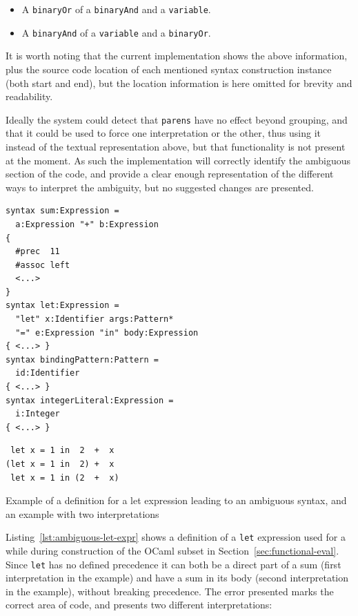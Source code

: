 \documentclass{kththesis}
\begin{document}
\begin{itemize}
  \item A \texttt{binaryOr} of a \texttt{binaryAnd} and a \texttt{variable}.
  \item A \texttt{binaryAnd} of a \texttt{variable} and a \texttt{binaryOr}.
\end{itemize}

It is worth noting that the current implementation shows the above information, plus the source code location of each mentioned syntax construction instance (both start and end), but the location information is here omitted for brevity and readability.

Ideally the system could detect that \texttt{parens} have no effect beyond grouping, and that it could be used to force one interpretation or the other, thus using it instead of the textual representation above, but that functionality is not present at the moment. As such the implementation will correctly identify the ambiguous section of the code, and provide a clear enough representation of the different ways to interpret the ambiguity, but no suggested changes are presented.

\begin{listing}[t]
\begin{verbatim}
syntax sum:Expression =
  a:Expression "+" b:Expression
{
  #prec  11
  #assoc left
  <...>
}
syntax let:Expression =
  "let" x:Identifier args:Pattern*
  "=" e:Expression "in" body:Expression
{ <...> }
syntax bindingPattern:Pattern =
  id:Identifier
{ <...> }
syntax integerLiteral:Expression =
  i:Integer
{ <...> }
\end{verbatim}
\begin{verbatim}
 let x = 1 in  2  +  x
(let x = 1 in  2) +  x
 let x = 1 in (2  +  x)
\end{verbatim}
\caption{Example of a definition for a let expression leading to an ambiguous syntax, and an example with two interpretations}
\label{lst:ambiguous-let-expr}
\end{listing}

Listing~\ref{lst:ambiguous-let-expr} shows a definition of a \texttt{let} expression used for a while during construction of the OCaml subset in Section~\ref{sec:functional-eval}. Since \texttt{let} has no defined precedence it can both be a direct part of a sum (first interpretation in the example) and have a sum in its body (second interpretation in the example), without breaking precedence. The error presented marks the correct area of code, and presents two different interpretations:
\end{document}

